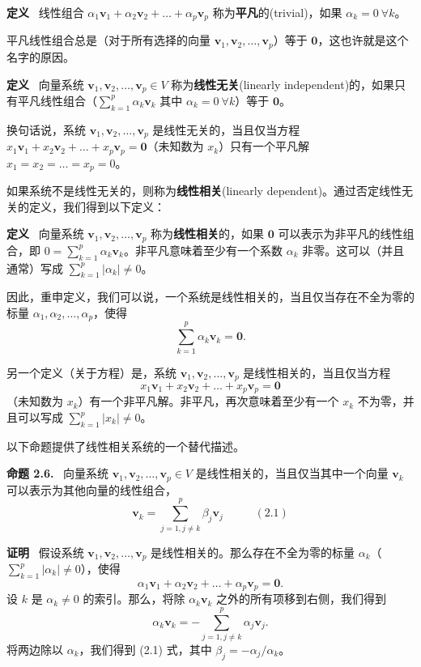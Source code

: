 \textbf{定义}~  线性组合 $\alpha_1 \mathbf{v}_1 + \alpha_2 \mathbf{v}_2 + \dots + \alpha_p \mathbf{v}_p$ 称为\textbf{平凡}的(trivial)，如果 $\alpha_k = 0 \ \forall k$。

平凡线性组合总是（对于所有选择的向量 $\mathbf{v}_1, \mathbf{v}_2, \dots, \mathbf{v}_p$）等于 $\mathbf{0}$，这也许就是这个名字的原因。


\textbf{定义}~ 向量系统 $\mathbf{v}_1, \mathbf{v}_2, \dots, \mathbf{v}_p \in V$ 称为\textbf{线性无关}(linearly independent)的，如果只有平凡线性组合（$\sum_{k=1}^p \alpha_k \mathbf{v}_k$ 其中 $\alpha_k = 0 \ \forall k$）等于 $\mathbf{0}$。

换句话说，系统 $\mathbf{v}_1, \mathbf{v}_2, \dots, \mathbf{v}_p$ 是线性无关的，当且仅当方程 $x_1 \mathbf{v}_1 + x_2 \mathbf{v}_2 + \dots + x_p \mathbf{v}_p = \mathbf{0}$（未知数为 $x_k$）只有一个平凡解 $x_1 = x_2 = \dots = x_p = 0$。


如果系统不是线性无关的，则称为\textbf{线性相关}(linearly dependent)。通过否定线性无关的定义，我们得到以下定义：



\textbf{定义}~ 向量系统 $\mathbf{v}_1, \mathbf{v}_2, \dots, \mathbf{v}_p$ 称为\textbf{线性相关}的，如果 $\mathbf{0}$ 可以表示为非平凡的线性组合，即 $0 = \sum_{k=1}^p \alpha_k \mathbf{v}_k$。非平凡意味着至少有一个系数 $\alpha_k$ 非零。这可以（并且通常）写成 $\sum_{k=1}^p |\alpha_k| \neq 0$。


因此，重申定义，我们可以说，一个系统是线性相关的，当且仅当存在不全为零的标量 $\alpha_1, \alpha_2, \dots, \alpha_p$，使得 
$$\sum_{k=1}^p \alpha_k \mathbf{v}_k = \mathbf{0}.$$

另一个定义（关于方程）是，系统 $\mathbf{v}_1, \mathbf{v}_2, \dots, \mathbf{v}_p$ 是线性相关的，当且仅当方程 
$$x_1 \mathbf{v}_1 + x_2 \mathbf{v}_2 + \dots + x_p \mathbf{v}_p = \mathbf{0}$$
（未知数为 $x_k$）有一个非平凡解。非平凡，再次意味着至少有一个 $x_k$ 不为零，并且可以写成 $\sum_{k=1}^p |x_k| \neq 0$。

以下命题提供了线性相关系统的一个替代描述。

\textbf{命题 2.6.}~ 向量系统 $\mathbf{v}_1, \mathbf{v}_2, \dots, \mathbf{v}_p \in V$ 是线性相关的，当且仅当其中一个向量 $\mathbf{v}_k$ 可以表示为其他向量的线性组合，
\begin{equation}\nonumber
\mathbf{v}_k = \sum_{j=1, j \neq k}^p \beta_j \mathbf{v}_j ~~~~~~~~\quad (2.1)
\end{equation}


\textbf{证明}~ 
 假设系统 $\mathbf{v}_1, \mathbf{v}_2, \dots, \mathbf{v}_p$ 是线性相关的。那么存在不全为零的标量 $\alpha_k$（$\sum_{k=1}^p |\alpha_k| \neq 0$），使得 
$$\alpha_1 \mathbf{v}_1 + \alpha_2 \mathbf{v}_2 + \dots + \alpha_p \mathbf{v}_p = \mathbf{0}.$$
设 $k$ 是 $\alpha_k \neq 0$ 的索引。那么，将除 $\alpha_k \mathbf{v}_k$ 之外的所有项移到右侧，我们得到 $$\alpha_k \mathbf{v}_k = -\sum_{j=1, j \neq k}^p \alpha_j \mathbf{v}_j.$$
将两边除以 $\alpha_k$，我们得到 (2.1) 式，其中 $\beta_j = -\alpha_j / \alpha_k$。

